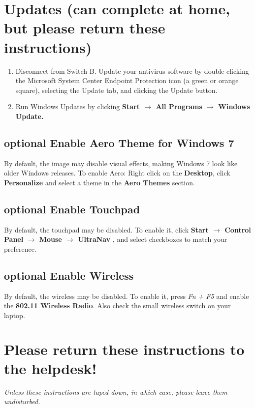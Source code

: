 \documentclass[10pt]{article}
\begin{document}
\section{Updates (can complete at home, but please return these instructions)}
\begin{enumerate}
\item Disconnect from Switch B. Update your antivirus software by double-clicking the Microsoft System Center Endpoint Protection icon (a green or orange square), selecting the Update tab, and clicking the Update button.
\item Run Windows Updates by clicking {\bf Start $\rightarrow$ All Programs $\rightarrow$ Windows Update.}
\end{enumerate}
\subsection{{\sc optional} Enable Aero Theme for Windows 7}
By default, the image may disable visual effects, making Windows 7 look like older Windows releases. To enable Aero:
Right click on the {\bf Desktop}, click {\bf Personalize} and select a theme in the {\bf Aero Themes} section.
\subsection{{\sc optional} Enable Touchpad}
By default, the touchpad may be disabled. To enable it, click {\bf Start $\rightarrow$ Control Panel $\rightarrow$ Mouse $\rightarrow$ UltraNav} , and select checkboxes to match your preference.
\subsection{{\sc optional} Enable Wireless}
By default, the wireless may be disabled. To enable it, press \emph{Fn + F5} and enable the {\bf 802.11 Wireless Radio}. Also check the small wireless switch on your laptop.
\section{Please return these instructions to the helpdesk!}
\emph{Unless these instructions are taped down, in which case, please leave them undisturbed.}
\end{document}
